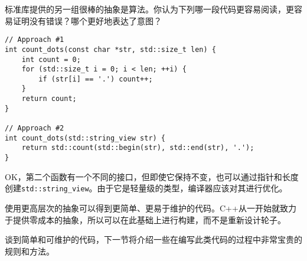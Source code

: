 标准库提供的另一组很棒的抽象是算法。你认为下列哪一段代码更容易阅读，更容易证明没有错误？哪个更好地表达了意图？


\begin{lstlisting}[style=styleCXX]
// Approach #1
int count_dots(const char *str, std::size_t len) {
	int count = 0;
	for (std::size_t i = 0; i < len; ++i) {
		if (str[i] == '.') count++;
	}
	return count;
}

// Approach #2
int count_dots(std::string_view str) {
	return std::count(std::begin(str), std::end(str), '.');
}

\end{lstlisting}

OK，第二个函数有一个不同的接口，但即使它保持不变，也可以通过指针和长度创建\texttt{std::string\_view}。由于它是轻量级的类型，编译器应该对其进行优化。

使用更高层次的抽象可以得到更简单、更易于维护的代码。C++从一开始就致力于提供零成本的抽象，所以可以在此基础上进行构建，而不是重新设计轮子。

谈到简单和可维护的代码，下一节将介绍一些在编写此类代码的过程中非常宝贵的规则和方法。















